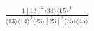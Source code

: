 \documentclass[varwidth, border=5pt]{standalone}
\begin{document}
\begin{my}
$\begin{gathered}
\scriptscriptstyle\frac{1[13]^2⟨34⟩⟨15⟩^4}{⟨13⟩⟨14⟩^2⟨23⟩[23]^2⟨35⟩⟨45⟩}
\end{gathered}$
\end{my}
\end{document}
